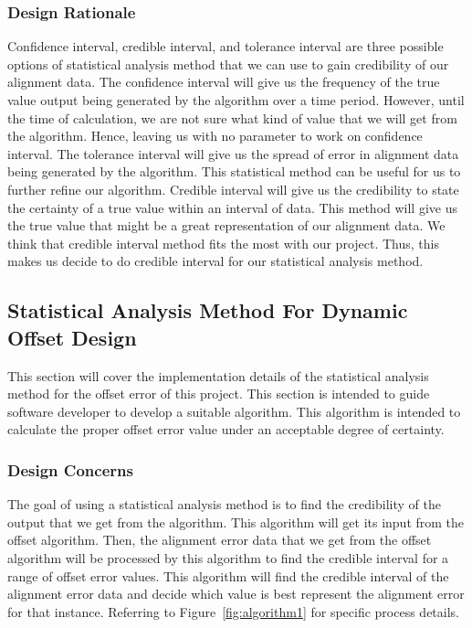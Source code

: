 		\subsubsection{Design Rationale}
		Confidence interval, credible interval, and tolerance interval are three possible options of statistical analysis method that we can use to gain credibility of our alignment data. The confidence interval will give us the frequency of the true value output being generated by the algorithm over a time period. However, until the time of calculation, we are not sure what kind of value that we will get from the algorithm. Hence, leaving us with no parameter to work on confidence interval. The tolerance interval will give us the spread of error in alignment data being generated by the algorithm. This statistical method can be useful for us to further refine our algorithm. Credible interval will give us the credibility to state the certainty of a true value within an interval of data. This method will give us the true value that might be a great representation of our alignment data. We think that credible interval method fits the most with our project. Thus, this makes us decide to do credible interval for our statistical analysis method.

	\subsection{Statistical Analysis Method For Dynamic Offset Design}
	This section will cover the implementation details of the statistical analysis method for the offset error of this project. This section is intended to guide software developer to develop a suitable algorithm. This algorithm is intended to calculate the proper offset error value under an acceptable degree of certainty.\\ 

	\subsubsection{Design Concerns}
	The goal of using a statistical analysis method is to find the credibility of the output that we get from the algorithm. This algorithm will get its input from the offset algorithm. Then, the alignment error data that we get from the offset algorithm will be processed by this algorithm to find the credible interval for a range of offset error values. This algorithm will find the credible interval of the alignment error data and decide which value is best represent the alignment error for that instance. Referring to Figure~\ref{fig:algorithm1} for specific process details.\\

